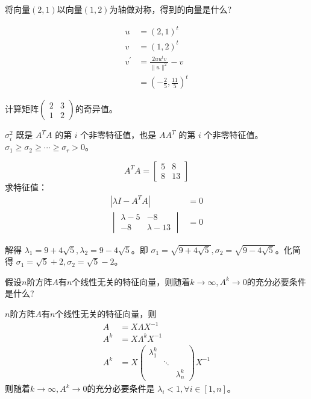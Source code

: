 \begin{problem}
	将向量$(2,1)$以向量$(1,2)$为轴做对称，得到的向量是什么?
\end{problem}
\begin{solution}
	$$\begin{aligned}
		u &= (2, 1)^t\\
		v &= (1, 2)^t\\
		v^\prime &= \frac{2uu^tv}{\|u\|^2} - v\\
		&=\left(-\frac{2}{5}, \frac{11}{5}\right)^t
	\end{aligned}$$
\end{solution}


\begin{problem}
	计算矩阵$\begin{pmatrix}2&3\\1&2\end{pmatrix}$的奇异值。
\end{problem}
\begin{remark}
	$\sigma_i^2$ 既是 $A^TA$ 的第 $i$ 个非零特征值，也是 $AA^T$ 的第 $i$ 个非零特征值。$\sigma_1 \ge \sigma_2 \ge \cdots \ge \sigma_r > 0$。
\end{remark}
\begin{solution}
	\[A^TA = \begin{bmatrix}
		5 & 8 \\
		8 & 13
	\end{bmatrix}\]
	求特征值：
	\begin{align*}
		|\lambda I - A^TA| &= 0\\
		\begin{vmatrix}
			\lambda - 5 & -8 \\
			-8 & \lambda - 13
		\end{vmatrix} &= 0
	\end{align*}

	解得 $\lambda_1 = 9 + 4\sqrt{5}, \lambda_2 = 9 - 4\sqrt{5}$。即 $\sigma_1 = \sqrt{9 + 4\sqrt{5}}, \sigma_2 = \sqrt{9 - 4\sqrt{5}}$。化简得 $\sigma_1 = \sqrt{5} + 2, \sigma_2 = \sqrt{5} - 2$。
\end{solution}


\begin{problem}
	假设$n$阶方阵$A$有$n$个线性无关的特征向量，则随着$k\to \infty,A^k\to 0$的充分必要条件是什么?
\end{problem}
\begin{solution}
	$n$阶方阵$A$有$n$个线性无关的特征向量，则 $$\begin{aligned}
		A &= X\Lambda X^{-1} \\	
		A^k &= X \Lambda^k X^{-1}\\
		A^k &= X \begin{pmatrix}  
			\lambda_1^k &  &  \\  
			 & \ddots & \\  
			 &  & \lambda_n^k  
		\end{pmatrix} X^{-1} 
	\end{aligned}$$
	则随着$k\to \infty,A^k\to 0$的充分必要条件是 $\lambda_i < 1,\forall i\in [1, n]$。
\end{solution}


